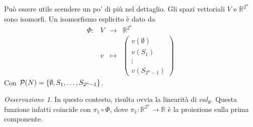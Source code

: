 \documentclass[a4paper,11pt]{article}
\theoremstyle{definition}				%
\theoremstyle{remark}
\newtheorem{oss}{Osservazione}%
\theoremstyle{plain}
\newcommand{\R}{\mathbb{R}}										%
\begin{document}
	Può essere utile scendere un po' di più nel dettaglio. Gli spazi vettoriali $V$ e $\R^{2^n}$ sono isomorfi. Un isomorfismo esplicito è dato da
	\[
		\begin{array}{rccc}
			\Phi\colon & V & \longrightarrow & \R^{2^n}\\
			 & v & \longmapsto & \begin{pmatrix}
			 v(\emptyset)\\
			 v(S_1)\\
			 \vdots\\
			 v(S_{2^n-1})
			 \end{pmatrix}
		\end{array}
	\]
	Con $\mathcal{P}(N)=\qty{\emptyset,S_1,\dots,S_{2^n-1}}$.
	
	\begin{oss}
		In questo contesto, risulta ovvia la linearità di $\textit{val}_{\emptyset}$. Questa funzione infatti coincide con $\pi_1\circ\Phi$, dove $\pi_1\colon\R^{2^n}\to\R$ è la proiezione sulla prima componente.
	\end{oss}
	
\end{document}
